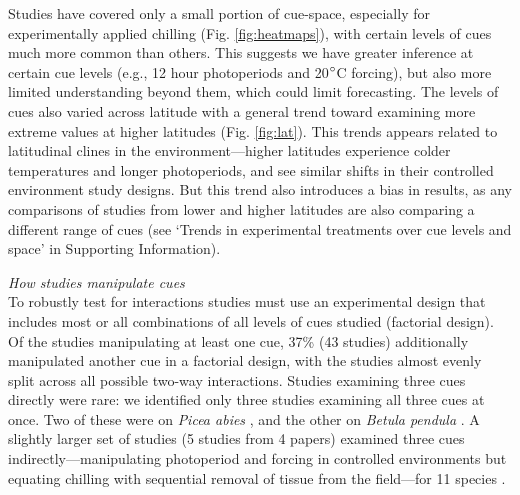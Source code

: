 \documentclass[11pt,letter]{article}
\begin{document}
Studies have covered only a small portion of cue-space, especially for experimentally applied chilling (Fig. \ref{fig:heatmaps}), with certain levels of cues much more common than others. This suggests we have greater inference at certain cue levels (e.g., 12 hour photoperiods and 20$\degree$C forcing), but also more limited understanding beyond them, which could limit forecasting. The levels of cues also varied across latitude with a general trend toward examining more extreme values at higher latitudes (Fig. \ref{fig:lat}). This trends appears related to latitudinal clines in the environment---higher latitudes experience colder temperatures and longer photoperiods, and see similar shifts in their controlled environment study designs. But this trend also introduces a bias in results, as any comparisons of studies from lower and higher latitudes are also comparing a different range of cues (see `Trends in experimental treatments over cue levels and space' in Supporting Information). 

\emph{How studies manipulate cues}\\ %

To robustly test for interactions studies must use an experimental design that includes most or all combinations of all levels of cues studied (factorial design). Of the studies manipulating at least one cue, 37\%  (43 studies) additionally manipulated another cue in a factorial design, with the studies almost evenly split across all possible two-way interactions. Studies examining three cues directly were rare: we identified only three studies examining all three cues at once. Two of these were on \emph{Picea abies} \citep{Worrall:1967aa,Sogaard:2008aa}, and the other on \emph{Betula pendula} \citep{Skuterud:1994aa}. A slightly larger set of studies (5 studies from 4 papers) examined three cues indirectly---manipulating photoperiod and forcing in controlled environments but equating chilling with sequential removal of tissue from the field---for 11 species \citep{Schnabel:1987aa,Heide:1993,Partanen:1998aa,Basler:2014aa}. \\
\end{document}
